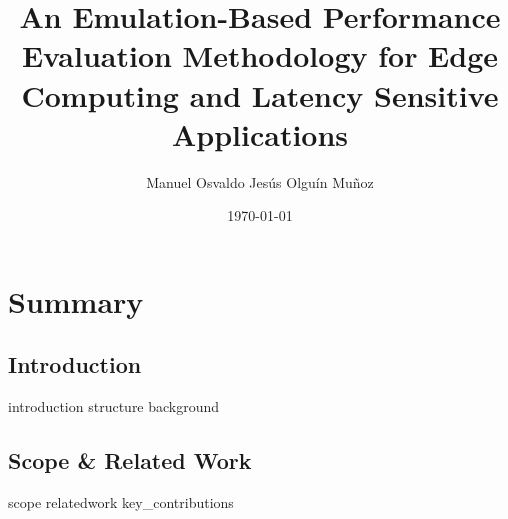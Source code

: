 \documentclass[electronic,oldfontcommands]{kthesis}
\begin{document}
\title{An Emulation-Based Performance Evaluation Methodology for Edge Computing and Latency Sensitive Applications}
\author{Manuel {Osvaldo Jesús} {Olguín Muñoz}}
\date{\today}
\address{%
	KTH Royal Institute of Technology\\%
	School of Electrical Engineering and Computer Science\\%
	Division of Information Science and Engineering\\%
	SE-10044 Stockholm\\%
	Sweden%
}

\maketitle

\frontmatter%




\clearpage%
\tableofcontents%
\printglossary[type=\acronymtype]%

\mainmatter%
\glsresetall{} %
\part{Summary}\label{part:summary}
\chapter{Introduction}\label{chap:introduction}
{introduction}
{structure}
{background}

\chapter{Scope \& Related Work}\label{chap:relwork}
{scope}
{relatedwork}
{key_contributions}
\end{document}

